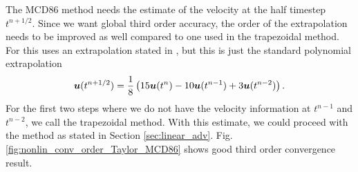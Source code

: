 \documentclass[11pt,letterpaper]{article}
\begin{document}
The MCD86 method needs the estimate of the velocity at the half timestep $t^{n+1/2}$. Since we want global third order accuracy, the order of the extrapolation needs to be improved as well compared to one used in the trapezoidal method. For this \cite[(19)]{mcdonald1987} uses an extrapolation stated in \cite{temperton1987}, but this is just the standard polynomial extrapolation
\begin{align*}
    \boldsymbol{u}(t^{n+1/2}) = \frac{1}{8}\left(15\boldsymbol{u}(t^n)-10\boldsymbol{u}(t^{n-1})+3\boldsymbol{u}(t^{n-2})\right). 
\end{align*}
For the first two steps where we do not have the velocity information at $t^{n-1}$ and $t^{n-2}$, we call the trapezoidal method. With this estimate, we could proceed with the method as stated in Section \ref{sec:linear_adv}. Fig. \ref{fig:nonlin_conv_order_Taylor_MCD86} shows good third order convergence result.
\end{document}
